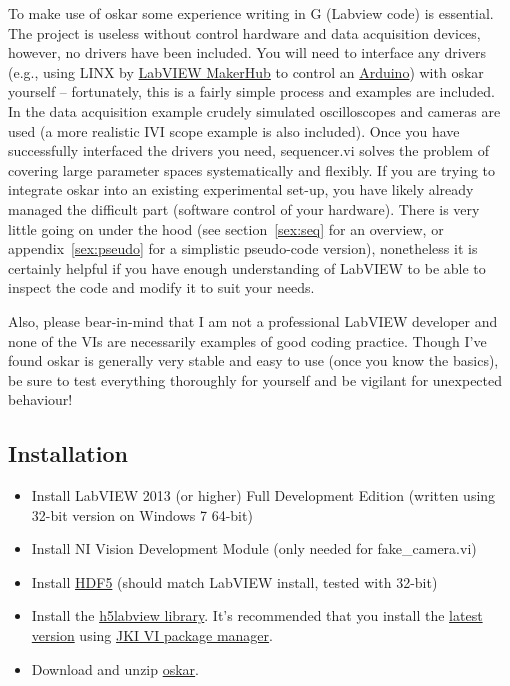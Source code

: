 \documentclass[10pt,a4paper]{article}
\begin{document}
To make use of oskar some experience writing in G (Labview code) is essential. The project is useless without control hardware and data acquisition devices, however, no drivers have been included. You will need to interface any drivers (e.g., using  LINX by \href{https://www.labviewmakerhub.com}{LabVIEW MakerHub} to control an  \href{https://www.arduino.cc/}{Arduino}) with oskar yourself -- fortunately, this is a fairly simple process and examples are included.  In the data acquisition example crudely simulated oscilloscopes and cameras are used (a more realistic IVI scope example is also included).  Once you have successfully  interfaced the drivers you need, sequencer.vi solves the problem of covering large parameter spaces systematically and flexibly.  If you are trying to integrate oskar into an existing experimental set-up, you have likely already managed the difficult part (software control of your hardware).  There is very little going on under the hood (see section~\ref{sex:seq} for an overview, or appendix~\ref{sex:pseudo} for a simplistic pseudo-code version),  nonetheless it is certainly helpful if you have enough understanding of LabVIEW to be able to inspect the code and modify it to suit your needs.

Also, please bear-in-mind that I am not a professional LabVIEW developer and none of the VIs are necessarily examples of good coding practice. Though I've found oskar is generally very stable and easy to use (once you know the basics), be sure to test everything thoroughly for yourself and be vigilant for unexpected behaviour!
\subsection*{Installation}

\begin{itemize}
\item Install LabVIEW 2013 (or higher) Full Development Edition (written using 32-bit version
 on Windows 7 64-bit)

\item Install NI Vision Development Module (only needed for fake\_camera.vi)

\item  Install \href{https://www.hdfgroup.org/HDF5/release/obtain5.html}{HDF5} (should match LabVIEW install, tested with 32-bit)

\item Install the \href{http://h5labview.sourceforge.net/}{h5labview library}.  It's recommended that you install the \href{https://sourceforge.net/projects/h5labview/files/}{latest version} using \href{http://vipm.jki.net/}{JKI VI package manager}. 

\item Download and unzip \href{https://github.com/PositroniumSpectroscopy/oskar}{oskar}.

\end{itemize}
\end{document}
